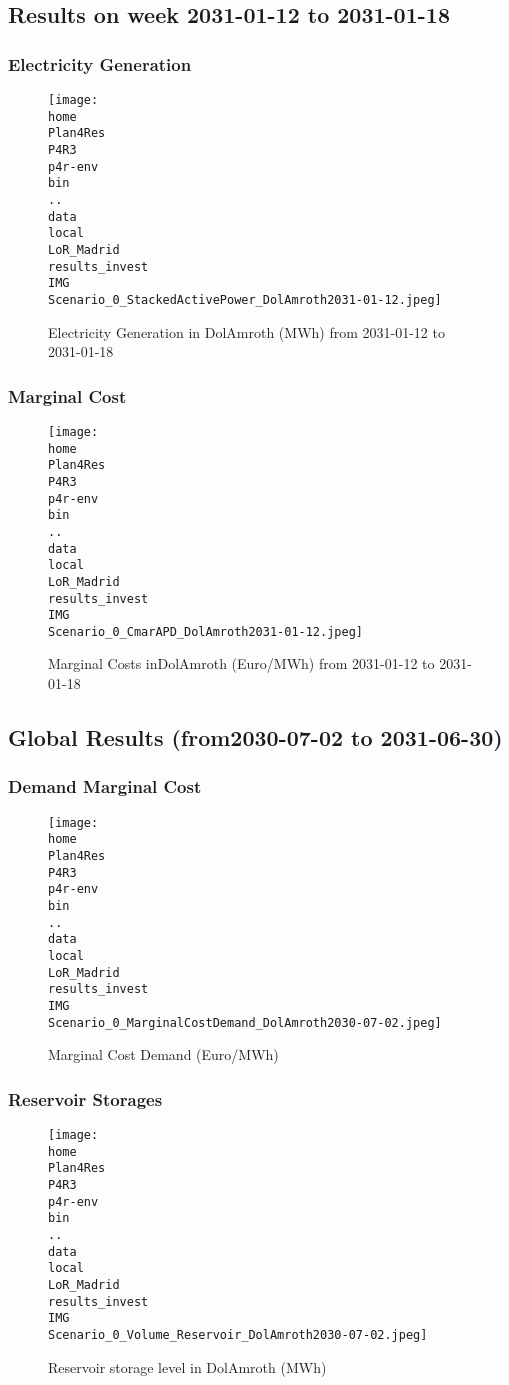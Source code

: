 \documentclass[10pt]{report}
\begin{document}
\subsection{Results on week 2031-01-12 to 2031-01-18}
\subsubsection{Electricity Generation}
\begin{figure}[H]
\centering
\texttt{[image: \\home\\Plan4Res\\P4R3\\p4r-env\\bin\\..\\data\\local\\LoR\_Madrid\\results\_invest\\IMG\\Scenario\_0\_StackedActivePower\_DolAmroth2031-01-12.jpeg]}
\caption{Electricity Generation in DolAmroth (MWh) from 2031-01-12 to 2031-01-18}
\label{fig:Scenario_0_StackedActivePower_DolAmroth2031-01-12.jpeg}
\end{figure}
\subsubsection{Marginal Cost}
\begin{figure}[H]
\centering
\texttt{[image: \\home\\Plan4Res\\P4R3\\p4r-env\\bin\\..\\data\\local\\LoR\_Madrid\\results\_invest\\IMG\\Scenario\_0\_CmarAPD\_DolAmroth2031-01-12.jpeg]}
\caption{Marginal Costs inDolAmroth (Euro/MWh) from 2031-01-12 to 2031-01-18}
\label{fig:Scenario_0_CmarAPD_DolAmroth2031-01-12.jpeg}
\end{figure}
\subsection{Global Results (from2030-07-02 to 2031-06-30)}
\subsubsection{Demand Marginal Cost}
\begin{figure}[H]
\centering
\texttt{[image: \\home\\Plan4Res\\P4R3\\p4r-env\\bin\\..\\data\\local\\LoR\_Madrid\\results\_invest\\IMG\\Scenario\_0\_MarginalCostDemand\_DolAmroth2030-07-02.jpeg]}
\caption{Marginal Cost Demand (Euro/MWh)}
\label{fig:Scenario_0_MarginalCostDemand_DolAmroth2030-07-02.jpeg}
\end{figure}
\subsubsection{Reservoir Storages}
\begin{figure}[H]
\centering
\texttt{[image: \\home\\Plan4Res\\P4R3\\p4r-env\\bin\\..\\data\\local\\LoR\_Madrid\\results\_invest\\IMG\\Scenario\_0\_Volume\_Reservoir\_DolAmroth2030-07-02.jpeg]}
\caption{Reservoir storage level in DolAmroth (MWh)}
\label{fig:Scenario_0_Volume_Reservoir_DolAmroth2030-07-02.jpeg}
\end{figure}
\end{document}
